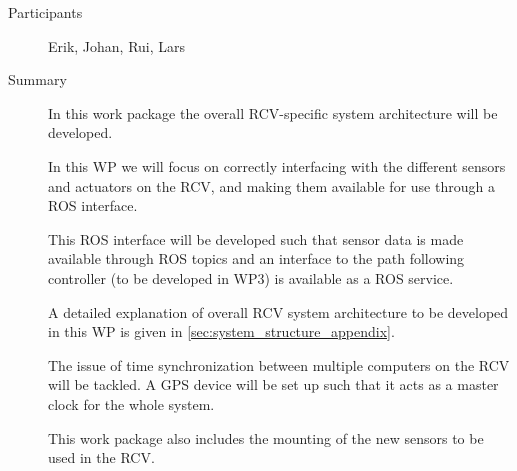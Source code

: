 \documentclass[11pt,a4paper]{article}
\begin{document}
\begin{description}
\item[Participants] Erik, Johan, Rui, Lars
\item[Summary] In this work package the overall RCV-specific system architecture will be developed.


In this WP we will focus on correctly interfacing with the different sensors and actuators on the RCV, and making them available for use through a ROS interface.

This ROS interface will be developed such that sensor data is made available through ROS topics and an interface to the path following controller (to be developed in WP3) is available as a ROS service.

A detailed explanation of overall RCV system architecture to be developed in this WP is given in \ref{sec:system_structure_appendix}.

The issue of time synchronization between multiple computers on the RCV will be tackled. A GPS device will be set up such that it acts as a master clock for the whole system.

This work package also includes the mounting of the new sensors to be used in the RCV.


   

\end{description}
\end{document}
